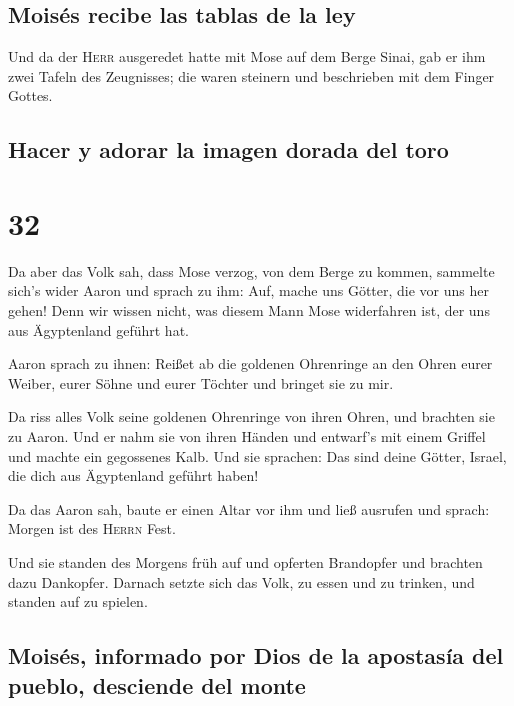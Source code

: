 \hypertarget{moisuxe9s-recibe-las-tablas-de-la-ley}{%
\subsection{Moisés recibe las tablas de la
ley}\label{moisuxe9s-recibe-las-tablas-de-la-ley}}

 Und da der \textsc{Herr} ausgeredet hatte mit Mose auf
dem Berge Sinai, gab er ihm zwei Tafeln des Zeugnisses; die waren
steinern und beschrieben mit dem Finger Gottes.

\hypertarget{hacer-y-adorar-la-imagen-dorada-del-toro}{%
\subsection{Hacer y adorar la imagen dorada del
toro}\label{hacer-y-adorar-la-imagen-dorada-del-toro}}

\hypertarget{section-31}{%
\section{32}\label{section-31}}

 Da aber das Volk sah, dass Mose verzog, von dem Berge zu
kommen, sammelte sich's wider Aaron und sprach zu ihm: Auf, mache uns
Götter, die vor uns her gehen! Denn wir wissen nicht, was diesem Mann
Mose widerfahren ist, der uns aus Ägyptenland geführt hat.

 Aaron sprach zu ihnen: Reißet ab die goldenen Ohrenringe
an den Ohren eurer Weiber, eurer Söhne und eurer Töchter und bringet sie
zu mir.

 Da riss alles Volk seine goldenen Ohrenringe von ihren
Ohren, und brachten sie zu Aaron.  Und er nahm sie von
ihren Händen und entwarf's mit einem Griffel und machte ein gegossenes
Kalb. Und sie sprachen: Das sind deine Götter, Israel, die dich aus
Ägyptenland geführt haben!

 Da das Aaron sah, baute er einen Altar vor ihm und ließ
ausrufen und sprach: Morgen ist des \textsc{Herrn} Fest.

 Und sie standen des Morgens früh auf und opferten
Brandopfer und brachten dazu Dankopfer. Darnach setzte sich das Volk, zu
essen und zu trinken, und standen auf zu spielen.

\hypertarget{moisuxe9s-informado-por-dios-de-la-apostasuxeda-del-pueblo-desciende-del-monte}{%
\subsection{Moisés, informado por Dios de la apostasía del pueblo,
desciende del
monte}\label{moisuxe9s-informado-por-dios-de-la-apostasuxeda-del-pueblo-desciende-del-monte}}

